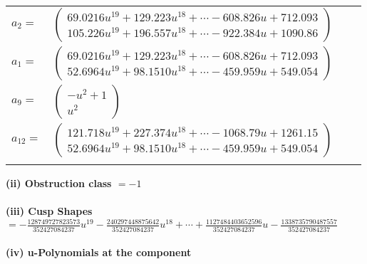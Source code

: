 \documentclass[1p]{elsarticle_modified}
\theoremstyle{definition}
\begin{document}
\begin{tabular}{m{7pt} m{180pt} m{7pt} m{180pt} }
\flushright $a_{2}=$&$\begin{pmatrix}69.0216 u^{19}+129.223 u^{18}+\cdots-608.826 u+712.093\\105.226 u^{19}+196.557 u^{18}+\cdots-922.384 u+1090.86\end{pmatrix}$ \\
\flushright $a_{1}=$&$\begin{pmatrix}69.0216 u^{19}+129.223 u^{18}+\cdots-608.826 u+712.093\\52.6964 u^{19}+98.1510 u^{18}+\cdots-459.959 u+549.054\end{pmatrix}$ \\
\flushright $a_{9}=$&$\begin{pmatrix}- u^2+1\\u^2\end{pmatrix}$ \\
\flushright $a_{12}=$&$\begin{pmatrix}121.718 u^{19}+227.374 u^{18}+\cdots-1068.79 u+1261.15\\52.6964 u^{19}+98.1510 u^{18}+\cdots-459.959 u+549.054\end{pmatrix}$\\&\end{tabular}
\flushleft \textbf{(ii) Obstruction class $= -1$}\\~\\
\flushleft \textbf{(iii) Cusp Shapes $= -\frac{128749727823573}{352427084237} u^{19}-\frac{240297448875642}{352427084237} u^{18}+\cdots+\frac{1127484403652596}{352427084237} u-\frac{1338735790487557}{352427084237}$}\\~\\
\newpage\renewcommand{\arraystretch}{1}
\flushleft \textbf{(iv) u-Polynomials at the component}\newline \\
\end{document}
